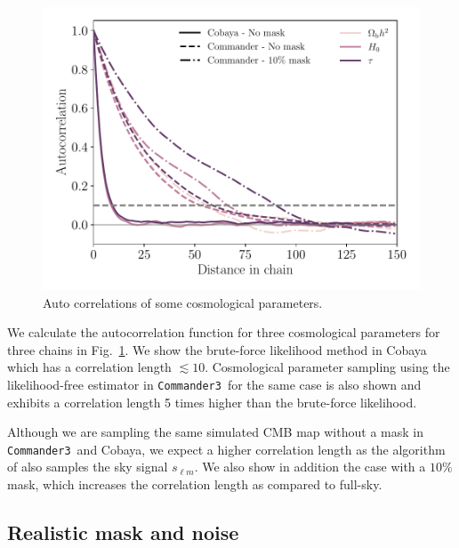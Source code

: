 \documentclass[twocolumn]{../common/aa}
\def\commanderthree{\texttt{Commander3}}
\begin{document}
\begin{figure}
	\centering
	\includegraphics[width=\linewidth]{figures/auto_correlation.pdf}
	\caption{\label{fig:autocorrelation}Auto correlations of some cosmological parameters.}
\end{figure}

We calculate the autocorrelation function for three cosmological parameters for three chains in Fig.~\ref{fig:autocorrelation}. We show the brute-force likelihood method in Cobaya which has a correlation length $\lesssim 10$. Cosmological parameter sampling using the likelihood-free estimator in \commanderthree\ for the same case is also shown and exhibits a correlation length 5 times higher than the brute-force likelihood.

Although we are sampling the same simulated CMB map without a mask in \commanderthree\ and Cobaya, we expect a higher correlation length as the algorithm of \citet{raccine2016} also samples the sky signal $s_{\ell m}$. We also show in addition the case with a $10\%$ mask, which increases the correlation length as compared to full-sky.

\subsection{Realistic mask and noise}
\end{document}

